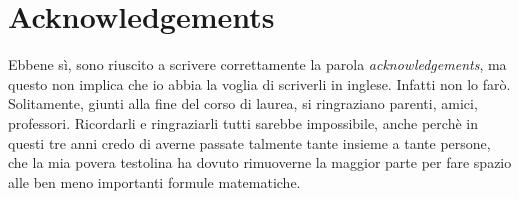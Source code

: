 \chapter*{Acknowledgements}
\label{acknowledgements}
\thispagestyle{plain}

Ebbene s\`i, sono riuscito a scrivere correttamente la parola \emph{acknowledgements}, ma questo non implica che io abbia la voglia di scriverli in inglese. Infatti non lo far\`o.\\
Solitamente, giunti alla fine del corso di laurea, si ringraziano parenti, amici, professori. Ricordarli e ringraziarli tutti sarebbe impossibile, anche perch\`e in questi tre anni credo di averne passate talmente tante insieme a tante persone, che la mia povera testolina ha dovuto rimuoverne la maggior parte per fare spazio alle ben meno importanti formule matematiche.\\

